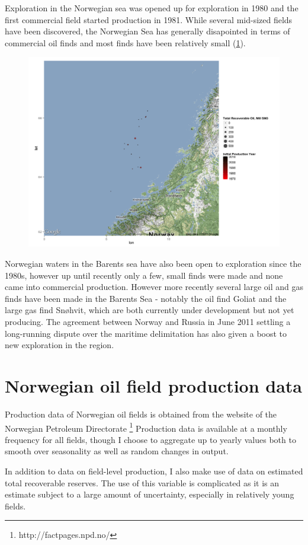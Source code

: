 \documentclass[12pt]{scrartcl} %
\begin{document}
Exploration in the Norwegian sea was opened up for exploration in 1980 and the first commercial field started production in 1981.  While several mid-sized fields have been discovered, the Norwegian Sea has generally disapointed in terms of commercial oil finds and most finds have been relatively small (\ref{norwegian_sea_reserves}).  

\begin{figure}
\includegraphics[width=.8\textwidth]{norwegian_sea_reserves.png}
\caption{}
\label{norwegian_sea_reserves}
\end{figure}
Norwegian waters in the Barents sea have also been open to exploration since the 1980s, however up until recently only a few, small finds were made and none came into commercial production.  However more recently several large oil and gas finds have been made in the Barents Sea - notably the oil find Goliat and the large gas find Snøhvit, which are both currently under development but not yet producing.  The agreement between Norway and Russia in June 2011 settling a long-running dispute over the maritime delimitation has also given a boost to new exploration in the region.  

\section{Norwegian oil field production data}
Production data of Norwegian oil fields is obtained from the website of the Norwegian Petroleum Directorate \footnote{http://factpages.npd.no/}  Production data is available at a monthly frequency for all fields, though I choose to aggregate up to yearly values both to smooth over seasonality as well as random changes in output.  

In addition to data on field-level production, I also make use of data on estimated total recoverable reserves.  The use of this variable is complicated as it is an estimate subject to a large amount of uncertainty, especially in relatively young fields.  
\end{document}
